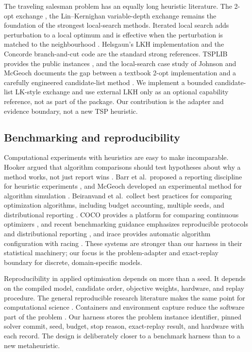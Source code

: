 \documentclass[pdflatex,sn-mathphys-num]{sn-jnl}
\begin{document}
The traveling salesman problem has an equally long heuristic literature. The 2-opt exchange \citep{croes1958}, the Lin--Kernighan
variable-depth exchange \citep{lin1973} remains the foundation of the strongest local-search methods.
Iterated local search adds perturbation to a local optimum and is effective when the perturbation is
matched to the neighbourhood \citep{lourenco2003}. Helsgaun's LKH implementation
\citep{helsgaun2000} and the Concorde branch-and-cut code \citep{applegate2006} are the standard strong
references. TSPLIB provides the public instances \citep{reinelt1991}, and the local-search case study
of Johnson and McGeoch documents the gap between a textbook 2-opt implementation and a carefully
engineered candidate-list method \citep{johnson1997}. We implement a bounded candidate-list
LK-style exchange and use external LKH only as an optional capability reference, not as part of the
package. Our contribution is the adapter and evidence boundary, not a new TSP heuristic.

\subsection{Benchmarking and reproducibility}

Computational experiments with heuristics are easy to make incomparable. Hooker argued that
algorithm comparisons should test hypotheses about why a method works, not just report wins
\citep{hooker1995}. Barr et al.\ proposed a reporting discipline for heuristic experiments
\citep{barr1995}, and McGeoch developed an experimental method for algorithm simulation
\citep{mcgeoch1996}. Beiranvand et al.\ collect best practices for comparing optimization algorithms,
including budget accounting, multiple seeds, and distributional reporting \citep{beiranvand2017}.
COCO provides a platform for comparing continuous optimizers \citep{hansen2020}, and recent benchmarking guidance emphasizes reproducible protocols and distributional reporting \citep{bartz2020}, and irace provides
automatic algorithm configuration with racing \citep{lopez2016}. These systems are stronger than our
harness in their statistical machinery; our focus is the problem-adapter and exact-replay boundary for
discrete, domain-specific models.

Reproducibility in applied optimisation depends on more than a seed. It depends on the compiled
model, candidate order, objective weights, hardware, and replay procedure. The general reproducible
research literature makes the same point for computational science
\citep{peng2011,sandve2013,wilson2014,stodden2016,donoho2009}. Containers and environment capture
reduce the software part of the problem \citep{boettiger2015,kurtzer2017}. Our harness stores the
problem instance identifier, pinned solver commit, seed, budget, stop reason, exact-replay result,
and hardware with each record. The design is deliberately closer to a benchmark harness than to a new
metaheuristic.
\end{document}
